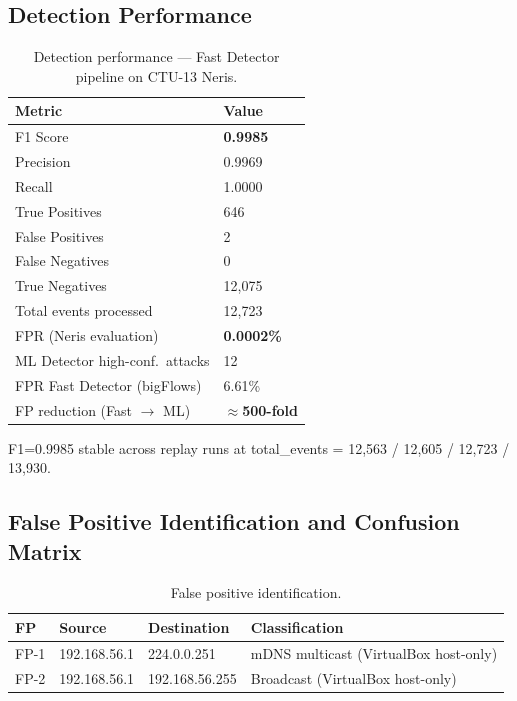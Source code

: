 \documentclass[11pt,a4paper]{article}
\begin{document}
    \subsection{Detection Performance}

    \begin{table}[h]
        \centering
        \caption{Detection performance --- Fast Detector pipeline on CTU-13 Neris.}
        \label{tab:detection}
        \begin{tabular}{ll}
            \toprule
            \textbf{Metric} & \textbf{Value} \\
            \midrule
            F1 Score                       & \textbf{0.9985} \\
            Precision                      & 0.9969 \\
            Recall                         & 1.0000 \\
            True Positives                 & 646 \\
            False Positives                & 2 \\
            False Negatives                & 0 \\
            True Negatives                 & 12,075 \\
            Total events processed         & 12,723 \\
            FPR (Neris evaluation)         & \textbf{0.0002\%} \\
            ML Detector high-conf.\ attacks & 12 \\
            FPR Fast Detector (bigFlows)   & 6.61\% \\
            FP reduction (Fast $\to$ ML)   & \textbf{${\approx}$500-fold} \\
            \bottomrule
        \end{tabular}
    \end{table}

    F1=0.9985 stable across replay runs at total\_events = 12,563 / 12,605 / 12,723 / 13,930.

    \subsection{False Positive Identification and Confusion Matrix}

    \begin{table}[h]
        \centering
        \caption{False positive identification.}
        \label{tab:fps}
        \begin{tabular}{llll}
            \toprule
            \textbf{FP} & \textbf{Source} & \textbf{Destination} & \textbf{Classification} \\
            \midrule
            FP-1 & 192.168.56.1 & 224.0.0.251     & mDNS multicast (VirtualBox host-only) \\
            FP-2 & 192.168.56.1 & 192.168.56.255  & Broadcast (VirtualBox host-only) \\
            \bottomrule
        \end{tabular}
    \end{table}
\end{document}
